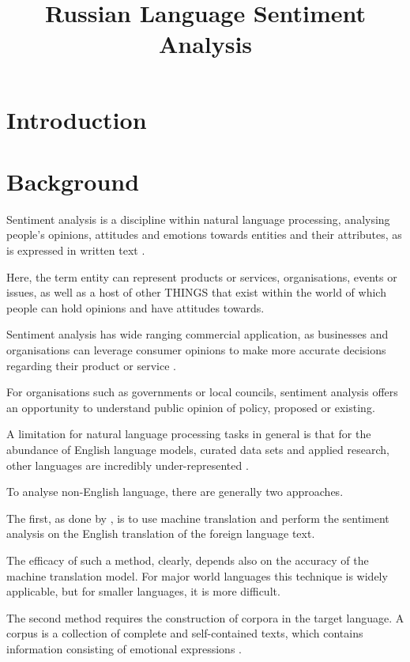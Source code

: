 \documentclass[12pt]{article}
\title{Russian Language Sentiment Analysis}
\date{}
\begin{document}
\maketitle

\section{Introduction}

\section{Background}

Sentiment analysis is a discipline within natural language processing, analysing people's opinions, attitudes and emotions towards entities and their attributes, as is expressed in written text \parencite{saTextbook}.

Here, the term entity can represent products or services, organisations, events or issues, as well as a host of other THINGS that exist within the world of which people can hold opinions and have attitudes towards.

Sentiment analysis has wide ranging commercial application, as businesses and organisations can leverage consumer opinions to make more accurate decisions regarding their product or service \parencite{deepSAreview}.

For organisations such as governments or local councils, sentiment analysis offers an opportunity to understand public opinion of policy, proposed or existing.

A limitation for natural language processing tasks in general is that for the abundance of English language models, curated data sets and applied research, other languages are incredibly under-represented \parencite{parrots, fivebias}.

To analyse non-English language, there are generally two approaches.

The first, as done by \citet{bautin2008international}, is to use machine translation and perform the sentiment analysis on the English translation of the foreign language text.

The efficacy of such a method, clearly, depends also on the accuracy of the machine translation model. For major world languages this technique is widely applicable, but for smaller languages, it is more difficult.

The second method requires the construction of corpora in the target language.
A corpus is a collection of complete and self-contained texts, which contains information consisting of emotional expressions \parencite{chineseSentiment}.
\end{document}
